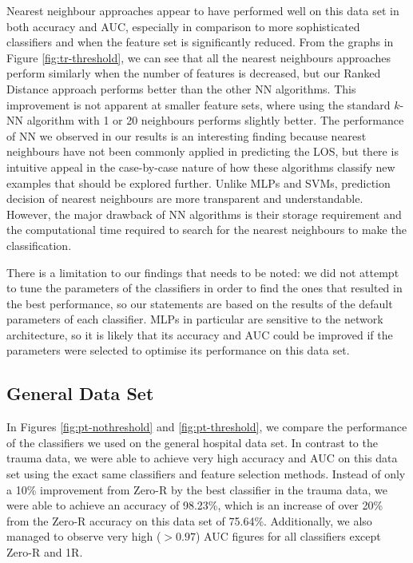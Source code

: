 Nearest neighbour approaches appear to have performed well on this data set in
both accuracy and AUC, especially in comparison to more sophisticated
classifiers and when the feature set is significantly reduced. From the graphs
in Figure \ref{fig:tr-threshold}, we can see that all the nearest neighbours
approaches perform similarly when the number of features is decreased, but our
Ranked Distance approach performs better than the other NN algorithms. This
improvement is not apparent at smaller feature sets, where using the standard
$k$-NN algorithm with 1 or 20 neighbours performs slightly better.
The performance of NN we observed in our results is
an interesting finding because nearest neighbours have not been commonly
applied in predicting the LOS, but there is intuitive appeal in the
case-by-case nature of how these algorithms classify new examples that should
be explored further. Unlike MLPs and SVMs, prediction decision of nearest
neighbours are more transparent and understandable. However, the major drawback
of NN algorithms is their storage requirement and the computational time
required to search for the nearest neighbours to make the classification.

There is a limitation to our findings that needs to be noted: we did not
attempt to tune the parameters of the classifiers in order to find the ones
that resulted in the best performance, so our statements are based on the
results of the default parameters of each classifier.
MLPs in particular are sensitive to
the network architecture, so it is likely that its accuracy and AUC could be
improved if the parameters were selected to optimise its performance on this
data set.

\subsection{General Data Set}
In Figures \ref{fig:pt-nothreshold} and \ref{fig:pt-threshold}, we compare the
performance of the classifiers we used on the general hospital data set. In
contrast to the trauma data, we were able to achieve very high accuracy and
AUC on this data set using the exact same classifiers and feature selection
methods. Instead of only a 10\% improvement from Zero-R by the best classifier
in the trauma data, we were able to achieve an accuracy of 98.23\%, which is
an increase of over 20\% from the Zero-R accuracy on this data set of 75.64\%.
Additionally, we also managed to observe very high ($>0.97$) AUC figures for
all classifiers except Zero-R and 1R.

